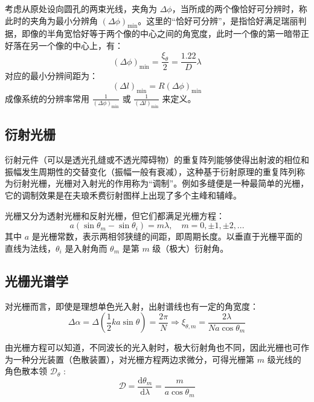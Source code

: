 \documentclass[UTF8]{report}
\theoremstyle{MyLineTheoremStyle} %
\theoremstyle{MyBlockTheoremStyle} %
\theoremstyle{MySubsubsectionStyle} %
\begin{document}
考虑从原处设向圆孔的两束光线，夹角为 $\Delta \phi$，当所成的两个像恰好可分辨时，称此时的夹角为最小分辨角 $\left(\Delta \phi\right)_{\min}$。这里的“恰好可分辨”，是指恰好满足瑞丽判据，即像的半角宽恰好等于两个像的中心之间的角宽度，此时一个像的第一暗带正好落在另一个像的中心上，有：
\begin{equation}
    \left(\Delta \phi\right)_{\min} = \frac{\xi_\theta}{2} = \frac{1.22}{D}\lambda
\end{equation}
对应的最小分辨间距为：
\begin{equation}
\left(\Delta l\right)_{\min} = R \left(\Delta \phi\right)_{\min} 
\end{equation}
成像系统的分辨率常用 $\frac{1}{\left(\Delta \phi\right)_{\min}}$ 或 $\frac{1}{\left(\Delta l\right)_{\min}}$ 来定义。

\subsection{衍射光栅}

衍射元件（可以是透光孔缝或不透光障碍物）的重复阵列能够使得出射波的相位和振幅发生周期性的交替变化（振幅一般有衰减），这种基于衍射原理的重复阵列称为衍射光栅，光栅对入射光的作用称为“调制”。例如多缝便是一种最简单的光栅，它的调制效果是在夫琅禾费衍射图样上出现了多个主峰和辅峰。

光栅又分为透射光栅和反射光栅，但它们都满足光栅方程：
\begin{equation}
    a(\sin \theta_m - \sin \theta_i) = m\lambda,\quad m = 0, \pm 1, \pm 2, ...
\end{equation}
其中 $a$ 是光栅常数，表示两相邻狭缝的间距，即周期长度。以垂直于光栅平面的直线为法线，$\theta_i$ 是入射角而 $\theta_m$ 是第 $m$ 级（极大）衍射角。

\subsection{光栅光谱学}
对光栅而言，即使是理想单色光入射，出射谱线也有一定的角宽度：
\begin{equation}
\Delta \alpha = \Delta \left( \frac{1}{2}ka \sin \theta \right) = \frac{2 \pi}{N} \Longrightarrow \xi_{\theta, m} = \frac{2 \lambda}{Na \cos \theta_m}
\end{equation}

由光栅方程可以知道，不同波长的光入射时，极大衍射角也不同，因此光栅也可作为一种分光装置（色散装置），对光栅方程两边求微分，可得光栅第 $m$ 级光线的角色散本领 $\mathscr{D}_\theta$ : 
\begin{equation}
    \mathscr{D} =  \frac{\mathrm{d}\theta_m}{\mathrm{d}\lambda} = \frac{m}{a\cos \theta_m}
\end{equation}
\end{document}
